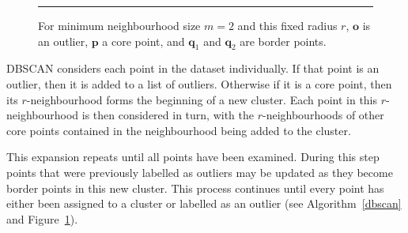 \begin{figure}[b]
\hrule \vspace{0.4cm}
\centering
{}
\caption{For minimum neighbourhood size $m=2$ and this fixed radius $r$, $\mathbf{o}$ is an outlier, $\mathbf{p}$ a core point, and $\mathbf{q}_1$ and $\mathbf{q}_2$ are border points.}
\label{DBSCANlabels}
\end{figure}
\noindent DBSCAN considers each point in the dataset individually. If that point is an outlier, then it is added to a list of outliers. Otherwise if it is a core point, then its $r$-neighbourhood forms the beginning of a new cluster. Each point in this $r$-neighbourhood is then considered in turn, with the $r$-neighbourhoods of other core points contained in the neighbourhood being added to the cluster. \par This expansion repeats until all points have been examined. During this step points that were previously labelled as outliers may be updated as they become border points in this new cluster. This process continues until every point has either been assigned to a cluster or labelled as an outlier (see Algorithm~\ref{dbscan} and Figure~\ref{DBSCANlabels}).

